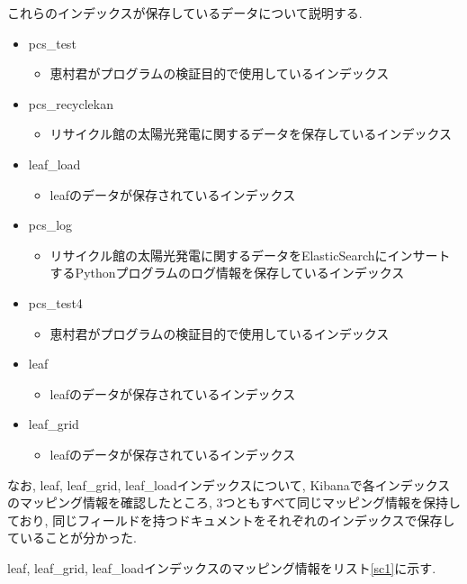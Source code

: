 \documentclass[a4j,12pt,]{jarticle}
\begin{document}
これらのインデックスが保存しているデータについて説明する.

\begin{itemize}
  \item pcs\_test
  \begin{itemize}
    \item 恵村君がプログラムの検証目的で使用しているインデックス
  \end{itemize}
  \item pcs\_recyclekan
  \begin{itemize}
    \item リサイクル館の太陽光発電に関するデータを保存しているインデックス
  \end{itemize}
  \item leaf\_load
  \begin{itemize}
    \item leafのデータが保存されているインデックス
  \end{itemize}
  \item pcs\_log
  \begin{itemize}
    \item リサイクル館の太陽光発電に関するデータをElasticSearchにインサートするPythonプログラムのログ情報を保存しているインデックス
  \end{itemize}
  \item pcs\_test4
  \begin{itemize}
    \item 恵村君がプログラムの検証目的で使用しているインデックス
  \end{itemize}
  \item leaf
  \begin{itemize}
    \item leafのデータが保存されているインデックス
  \end{itemize}
  \item leaf\_grid
  \begin{itemize}
    \item leafのデータが保存されているインデックス
  \end{itemize}
\end{itemize}

なお, leaf, leaf\_grid, leaf\_loadインデックスについて, Kibanaで各インデックスのマッピング情報を確認したところ, 3つともすべて同じマッピング情報を保持しており, 同じフィールドを持つドキュメントをそれぞれのインデックスで保存していることが分かった.

leaf, leaf\_grid, leaf\_loadインデックスのマッピング情報をリスト\ref{sc1}に示す.
\end{document}
